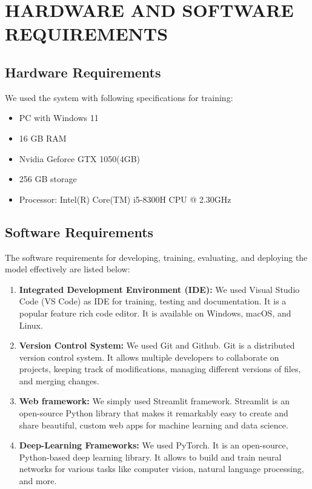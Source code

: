 \newpage
\section{HARDWARE AND SOFTWARE REQUIREMENTS}
\subsection{Hardware Requirements}
We used the system with following specifications for training:
\begin{itemize}
    \item PC with Windows 11
    \item 16 GB RAM 
    \item Nvidia Geforce GTX 1050(4GB)
    \item 256 GB storage
    \item Processor: Intel(R) Core(TM) i5-8300H CPU @ 2.30GHz
\end{itemize}
\subsection{Software Requirements}
The software requirements for developing, training, evaluating, and deploying the
model effectively are listed below: 
\begin{enumerate}
    \item {\bf Integrated Development Environment (IDE):} We used Visual Studio Code (VS Code) as IDE for training, testing and documentation. 
    It  is a popular feature rich code editor. It is available on Windows, macOS, and Linux.
    \item {\bf Version Control System:} We used Git and Github. Git is a distributed version control system. It allows multiple developers to collaborate on projects, keeping track of modifications, managing different versions of files, and merging changes.
    \item {\bf Web framework:} We simply used Streamlit framework. Streamlit is an open-source Python library that makes it remarkably easy to create and share beautiful, custom web apps for machine learning and data science.
    \item {\bf Deep-Learning Frameworks:} We used PyTorch. It is an open-source, Python-based deep learning library. It allows to build and train neural networks for various tasks like computer vision, natural language processing, and more.
\end{enumerate}